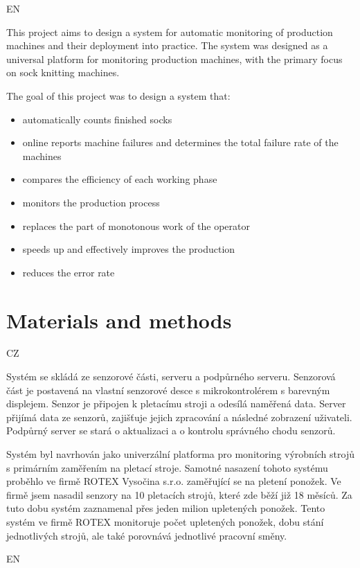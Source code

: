 \documentclass[12pt, a4paper]{article}
\begin{document}
EN

This project aims to design a system for automatic monitoring of production machines and their deployment into practice.
The system was designed as a universal platform for monitoring production machines, with the primary focus on sock knitting machines.

The goal of this project was to design a system that:

\begin{itemize}
    \item automatically counts finished socks
    \item online reports machine failures and determines the total failure rate of the machines
    \item compares the efficiency of each working phase
    \item monitors the production process
    \item replaces the part of monotonous work of the operator
    \item speeds up and effectively improves the production
    \item reduces the error rate
\end{itemize}


\section*{Materials and methods}
CZ

Systém se skládá ze senzorové části, serveru a podpůrného serveru.
Senzorová část je postavená na vlastní senzorové desce s mikrokontrolérem s barevným displejem.
Senzor je připojen k pletacímu stroji a odesílá naměřená data.
Server přijímá  data ze senzorů, zajišťuje jejich zpracování a následné zobrazení uživateli.
Podpůrný server se stará o aktualizaci a o kontrolu správného chodu senzorů.

Systém byl navrhován jako univerzální platforma pro monitoring výrobních strojů s primárním zaměřením na pletací stroje.
Samotné nasazení tohoto systému proběhlo ve firmě ROTEX Vysočina s.r.o. zaměřující se na pletení ponožek.
Ve firmě jsem nasadil senzory na 10 pletacích strojů, které zde běží již 18 měsíců.
Za tuto dobu systém zaznamenal přes jeden milion upletených ponožek.
Tento systém ve firmě ROTEX monitoruje počet upletených ponožek, dobu stání jednotlivých strojů, ale také porovnává jednotlivé pracovní směny.

EN
\end{document}
